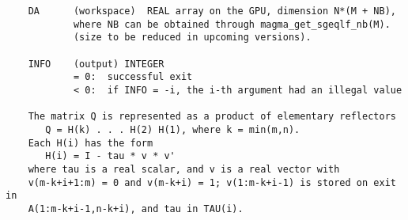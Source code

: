 \documentclass[10pt]{book}
\begin{document}
\begin{verbatim}
    DA      (workspace)  REAL array on the GPU, dimension N*(M + NB),
            where NB can be obtained through magma_get_sgeqlf_nb(M).
            (size to be reduced in upcoming versions).

    INFO    (output) INTEGER
            = 0:  successful exit
            < 0:  if INFO = -i, the i-th argument had an illegal value

    The matrix Q is represented as a product of elementary reflectors
       Q = H(k) . . . H(2) H(1), where k = min(m,n).
    Each H(i) has the form
       H(i) = I - tau * v * v'
    where tau is a real scalar, and v is a real vector with
    v(m-k+i+1:m) = 0 and v(m-k+i) = 1; v(1:m-k+i-1) is stored on exit in
    A(1:m-k+i-1,n-k+i), and tau in TAU(i).
\end{verbatim}

\newpage
\end{document}
